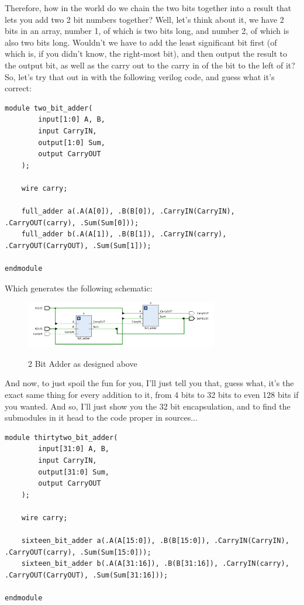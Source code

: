 \documentclass{article}
\begin{document}
Therefore, how in the world do we chain the two bits together into a result that lets you add two 2 bit numbers together? Well, let's think about it, we have 2 bits in an array, number 1, of which is two bits long, and number 2, of which is also two bits long. Wouldn't we have to add the least significant bit first (of which is, if you didn't know, the right-most bit), and then output the result to the output bit, as well as the carry out to the carry in of the bit to the left of it? So, let's try that out in with the following verilog code, and guess what it's correct:\newpage
\begin{lstlisting}[caption={2 Bit Adder Verilog Code}, label={2 Bit Adder Verilog}, style=Verilog]
module two_bit_adder(
        input[1:0] A, B,
        input CarryIN,
        output[1:0] Sum,
        output CarryOUT
    );
    
    wire carry;
    
    full_adder a(.A(A[0]), .B(B[0]), .CarryIN(CarryIN), .CarryOUT(carry), .Sum(Sum[0]));
    full_adder b(.A(A[1]), .B(B[1]), .CarryIN(carry), .CarryOUT(CarryOUT), .Sum(Sum[1]));
    
endmodule
\end{lstlisting}

Which generates the following schematic:
\begin{figure}[!htbp]
    \centering
    \caption{2 Bit Adder as designed above}
    \includegraphics[width=0.75\textwidth]{pictures/part1/two_bit_adder.png}
    \label{2 Bit Adder}
\end{figure}

And now, to just spoil the fun for you, I'll just tell you that, guess what, it's the exact same thing for every addition to it, from 4 bits to 32 bits to even 128 bits if you wanted. And so, I'll just show you the 32 bit encapsulation, and to find the submodules in it head to the code proper in sources...\newpage
\begin{lstlisting}[caption={32 Bit Adder Verilog Code}, label={32 Bit Adder Verilog}, style=Verilog]
module thirtytwo_bit_adder(
        input[31:0] A, B,
        input CarryIN,
        output[31:0] Sum,
        output CarryOUT
    );
    
    wire carry;
    
    sixteen_bit_adder a(.A(A[15:0]), .B(B[15:0]), .CarryIN(CarryIN), .CarryOUT(carry), .Sum(Sum[15:0]));
    sixteen_bit_adder b(.A(A[31:16]), .B(B[31:16]), .CarryIN(carry), .CarryOUT(CarryOUT), .Sum(Sum[31:16]));
    
endmodule
\end{lstlisting}
\end{document}
